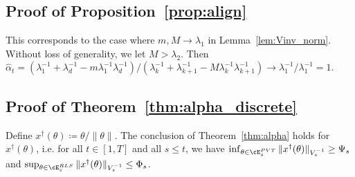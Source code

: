 %
%
%
%
\endproof



\subsection{Proof of Proposition~\ref{prop:align}}
\label{proof:align}
	This corresponds to the case where $m, M \to \lambda_1$ in Lemma~\ref{lem:Vinv_norm}.
	Without loss of generality, we let $M>\lambda_2$. Then
	$
	\hat{\alpha}_t  =(\lambda_{1}^{-1} + \lambda_{d}^{-1}   - m{\lambda_{1}^{-1}\lambda_{d}^{-1} })/(\lambda_{k}^{-1} +  \lambda_{k+1}^{-1}   - {M}{\lambda_{k}^{-1}\lambda_{k+1}^{-1} } ) \to \lambda_{1}^{-1}/\lambda_{1}^{-1} = 1
	$.\Halmos 
\endproof


\subsection{Proof of Theorem~\ref{thm:alpha_discrete}}
\label{proof:alpha_discrete}
Define $x^\dagger(\theta) \coloneqq \theta/\|\theta\| $. The conclusion of Theorem~\ref{thm:alpha} holds for $x^\dagger(\theta)$, i.e. for all $t \in [1,T]$ and all $s\leq t$, we have 
$
\inf _{\theta \in \cE_s^{\PVT}}\|x^\dagger(\theta)\|_{V_s^{-1}} \geq \Psi_s$ and $\sup _{\theta \in \cE_s^{RLS}}\|x^\dagger(\theta)\|_{V_s^{-1}} \leq \Phi_s
$.

